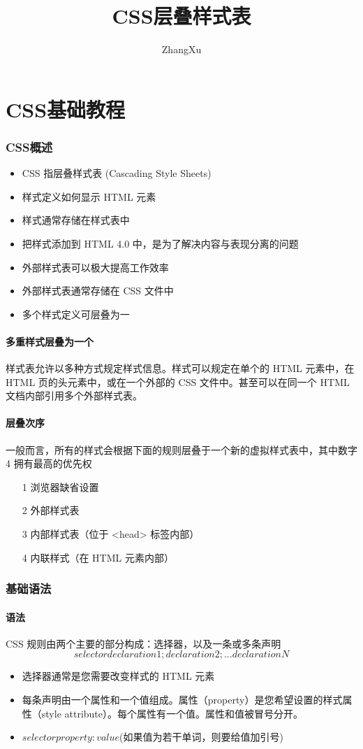 \documentclass[10pt,UTF8]{ctexart}
\title{CSS层叠样式表}
\author{ZhangXu}
\begin{document}
\maketitle
{}
\part{CSS基础教程}
\section{CSS概述}
\begin{itemize}
\item CSS 指层叠样式表 (Cascading Style Sheets)
\item 样式定义如何显示 HTML 元素
\item 样式通常存储在样式表中
\item 把样式添加到 HTML 4.0 中，是为了解决内容与表现分离的问题
\item 外部样式表可以极大提高工作效率
\item 外部样式表通常存储在 CSS 文件中
\item 多个样式定义可层叠为一
\end{itemize}

\subsection{多重样式层叠为一个}
样式表允许以多种方式规定样式信息。样式可以规定在单个的 HTML 元素中，在 HTML 页的头元素中，或在一个外部的 CSS 文件中。甚至可以在同一个 HTML 文档内部引用多个外部样式表。
\subsection{层叠次序}
一般而言，所有的样式会根据下面的规则层叠于一个新的虚拟样式表中，其中数字 4 拥有最高的优先权
\begin{itemize}
\item[1] 浏览器缺省设置 
\item[2] 外部样式表
\item[3] 内部样式表（位于 <head> 标签内部）
\item[4] 内联样式（在 HTML 元素内部）
\end{itemize}

\section{基础语法}
\subsection{语法}
CSS 规则由两个主要的部分构成：选择器，以及一条或多条声明
\[ selector {declaration1; declaration2; ... declarationN } \]
\begin{itemize}
\item 选择器通常是您需要改变样式的 HTML 元素
\item 每条声明由一个属性和一个值组成。属性（property）是您希望设置的样式属性（style attribute）。每个属性有一个值。属性和值被冒号分开。
\item $selector {property: value}$(如果值为若干单词，则要给值加引号)
\end{itemize}
\end{document}
